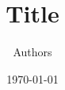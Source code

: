 \documentclass{a4paper,twoside,11pt}[scrartcl]
\begin{document}
\title{Title}
\author{Authors}
\date{\today}
\maketitle
\tableofcontents
\thispagestyle{empty}
\cleardoublepage

\end{document}
